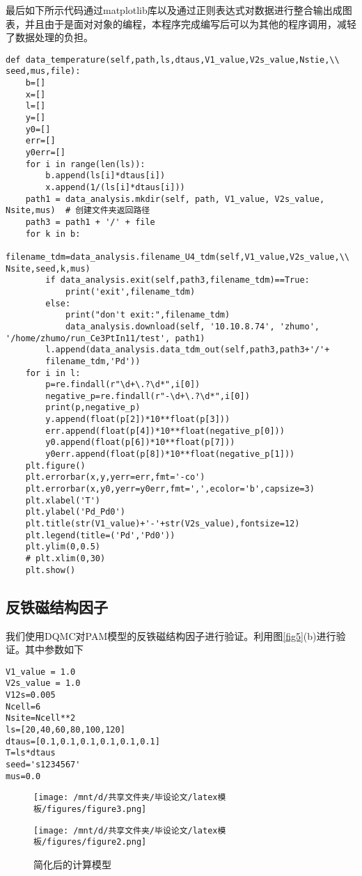最后如下所示代码通过matplotlib库以及通过正则表达式对数据进行整合输出成图表，并且由于是面对对象的编程，本程序完成编写后可以为其他的程序调用，减轻了数据处理的负担。
\begin{lstlisting}
def data_temperature(self,path,ls,dtaus,V1_value,V2s_value,Nstie,\\ seed,mus,file):
    b=[]
    x=[]
    l=[]
    y=[]
    y0=[]
    err=[]
    y0err=[]
    for i in range(len(ls)):
        b.append(ls[i]*dtaus[i])
        x.append(1/(ls[i]*dtaus[i]))
    path1 = data_analysis.mkdir(self, path, V1_value, V2s_value, Nsite,mus)  # 创建文件夹返回路径
    path3 = path1 + '/' + file
    for k in b:
        filename_tdm=data_analysis.filename_U4_tdm(self,V1_value,V2s_value,\\ Nsite,seed,k,mus)
        if data_analysis.exit(self,path3,filename_tdm)==True:
            print('exit',filename_tdm)
        else:
            print("don't exit:",filename_tdm)
            data_analysis.download(self, '10.10.8.74', 'zhumo', '/home/zhumo/run_Ce3PtIn11/test', path1)
        l.append(data_analysis.data_tdm_out(self,path3,path3+'/'+
        filename_tdm,'Pd'))
    for i in l:
        p=re.findall(r"\d+\.?\d*",i[0])
        negative_p=re.findall(r"-\d+\.?\d*",i[0])
        print(p,negative_p)
        y.append(float(p[2])*10**float(p[3]))
        err.append(float(p[4])*10**float(negative_p[0]))
        y0.append(float(p[6])*10**float(p[7]))
        y0err.append(float(p[8])*10**float(negative_p[1]))
    plt.figure()
    plt.errorbar(x,y,yerr=err,fmt='-co')
    plt.errorbar(x,y0,yerr=y0err,fmt=',',ecolor='b',capsize=3)
    plt.xlabel('T')
    plt.ylabel('Pd_Pd0')
    plt.title(str(V1_value)+'-'+str(V2s_value),fontsize=12)
    plt.legend(title=('Pd','Pd0'))
    plt.ylim(0,0.5)
    # plt.xlim(0,30)
    plt.show()
\end{lstlisting}



\subsection{反铁磁结构因子}
我们使用DQMC对PAM模型的反铁磁结构因子进行验证。利用图\ref{fig5}(b)进行验证。其中参数如下
\begin{lstlisting}
V1_value = 1.0
V2s_value = 1.0
V12s=0.005
Ncell=6
Nsite=Ncell**2
ls=[20,40,60,80,100,120]
dtaus=[0.1,0.1,0.1,0.1,0.1,0.1]
T=ls*dtaus
seed='s1234567'
mus=0.0
\end{lstlisting}


\begin{figure*}[htbp]
    \centering
    \begin{minipage}[t]{0.4\textwidth}
    \centering
    \texttt{[image: /mnt/d/共享文件夹/毕设论文/latex模板/figures/figure3.png]}
    \caption{(a)-(d)展示了在V=1时随着$\beta$的增加以及不同晶格大小的情况下AF结构因子的变化。}
    \label{fig5}
    \end{minipage}
    \begin{minipage}[t]{0.4\textwidth}
    \centering
    \texttt{[image: /mnt/d/共享文件夹/毕设论文/latex模板/figures/figure2.png]}
    \caption{简化后的计算模型}
    \label{fig6}
    \end{minipage}   
\end{figure*}


